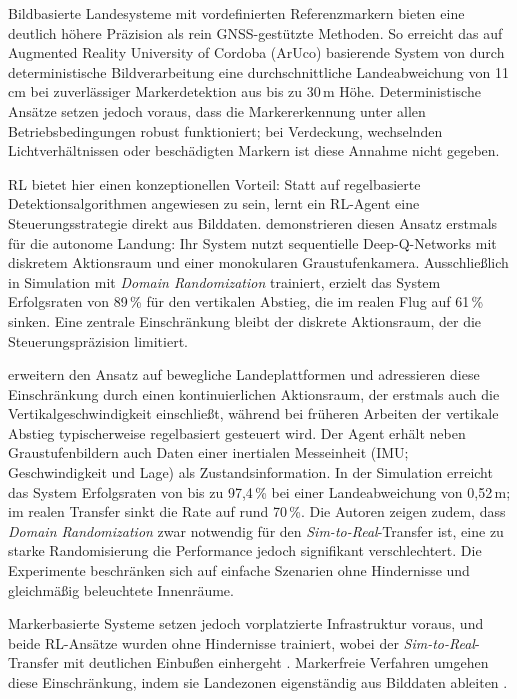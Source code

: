 Bildbasierte Landesysteme mit vordefinierten Referenzmarkern bieten eine deutlich höhere Präzision als rein GNSS-gestützte Methoden. So erreicht das auf Augmented Reality University of Cordoba (ArUco) basierende System von \textcite{wubbenAccurateLandingUnmanned2019} durch deterministische Bildverarbeitung eine durchschnittliche Landeabweichung von 11\,cm bei zuverlässiger Markerdetektion aus bis zu 30\,m Höhe. Deterministische Ansätze setzen jedoch voraus, dass die Markererkennung unter allen Betriebsbedingungen robust funktioniert; bei Verdeckung, wechselnden Lichtverhältnissen oder beschädigten Markern ist diese Annahme nicht gegeben.

RL bietet hier einen konzeptionellen Vorteil: Statt auf regelbasierte Detektionsalgorithmen angewiesen zu sein, lernt ein RL-Agent eine Steuerungsstrategie direkt aus Bilddaten. \textcite{polvaraSimtoRealQuadrotorLanding2020} demonstrieren diesen Ansatz erstmals für die autonome Landung: Ihr System nutzt sequentielle Deep-Q-Networks mit diskretem Aktionsraum und einer monokularen Graustufenkamera. Ausschließlich in Simulation mit \textit{Domain Randomization} trainiert, erzielt das System Erfolgsraten von 89\,\% für den vertikalen Abstieg, die im realen Flug auf 61\,\% sinken. Eine zentrale Einschränkung bleibt der diskrete Aktionsraum, der die Steuerungspräzision limitiert.

\textcite{ladoszAutonomousLandingMoving2024} erweitern den Ansatz auf bewegliche Landeplattformen und adressieren diese Einschränkung durch einen kontinuierlichen Aktionsraum, der erstmals auch die Vertikalgeschwindigkeit einschließt, während bei früheren Arbeiten der vertikale Abstieg typischerweise regelbasiert gesteuert wird. Der Agent erhält neben Graustufenbildern auch Daten einer inertialen Messeinheit (IMU; Geschwindigkeit und Lage) als Zustandsinformation. In der Simulation erreicht das System Erfolgsraten von bis zu 97,4\,\% bei einer Landeabweichung von 0,52\,m; im realen Transfer sinkt die Rate auf rund 70\,\%. Die Autoren zeigen zudem, dass \textit{Domain Randomization} zwar notwendig für den \textit{Sim-to-Real}-Transfer ist, eine zu starke Randomisierung die Performance jedoch signifikant verschlechtert. Die Experimente beschränken sich auf einfache Szenarien ohne Hindernisse und gleichmäßig beleuchtete Innenräume.

Markerbasierte Systeme setzen jedoch vorplatzierte Infrastruktur voraus, und beide RL-Ansätze wurden ohne Hindernisse trainiert, wobei der \textit{Sim-to-Real}-Transfer mit deutlichen Einbußen einhergeht \autocite[vgl.][]{polvaraSimtoRealQuadrotorLanding2020, ladoszAutonomousLandingMoving2024}. Markerfreie Verfahren umgehen diese Einschränkung, indem sie Landezonen eigenständig aus Bilddaten ableiten \autocite{yangMonocularVisionSLAMBased2018, bartolomeiAutonomousEmergencyLanding2022}.

